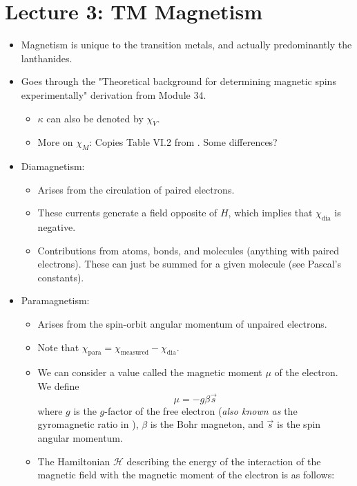 \documentclass[../notes.tex]{subfiles}
\begin{document}
\section{Lecture 3: TM Magnetism}
\begin{itemize}
    \item {}Magnetism is unique to the transition metals, and actually predominantly the lanthanides.
    \item Goes through the "Theoretical background for determining magnetic spins experimentally" derivation from Module 34.
    \begin{itemize}
        \item $\kappa$ can also be denoted by $\chi_V$.
        \item More on $\chi_M$: Copies Table VI.2 from \textcite{bib:CHEM20100Notes}. Some differences?
    \end{itemize}
    \item Diamagnetism:
    \begin{itemize}
        \item Arises from the circulation of paired electrons.
        \item These currents generate a field opposite of $H$, which implies that $\chi_\text{dia}$ is negative.
        \item Contributions from atoms, bonds, and molecules (anything with paired electrons). These can just be summed for a given molecule (see Pascal's constants).
    \end{itemize}
    \item Paramagnetism:
    \begin{itemize}
        \item Arises from the spin-orbit angular momentum of unpaired electrons.
        \item Note that $\chi_\text{para}=\chi_\text{measured}-\chi_\text{dia}$.
        \item We can consider a value called the magnetic moment $\mu$ of the electron. We define
        \begin{equation*}
            \mu = -g\beta\vec{s}
        \end{equation*}
        where $g$ is the $g$-factor of the free electron (\emph{also known as} the gyromagnetic ratio in \textcite[119]{bib:CHEM20100Notes}), $\beta$ is the Bohr magneton, and $\vec{s}$ is the spin angular momentum.
        \item The Hamiltonian $\mathcal{H}$ describing the energy of the interaction of the magnetic field with the magnetic moment of the electron is as follows:

\end{itemize}
\end{itemize}
\end{document}
